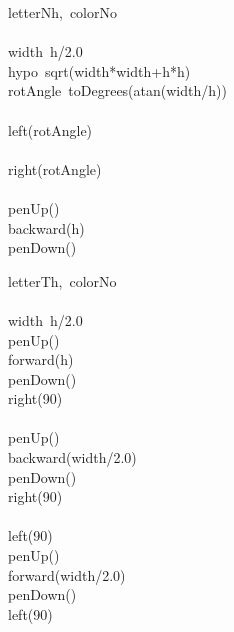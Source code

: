 \documentclass[a4paper,10pt]{article}
\begin{document}
\begin{pseudocode}{letterN}{h,\ colorNo }
\label{letterN}
\\
\\
  width\gets\ h/2.0\\
  hypo\gets\ sqrt(width*width+h*h)\\
  rotAngle\gets\ toDegrees(atan(width/h))\\
  \\
  left(rotAngle)\\
  \\
  right(rotAngle)\\
  \\
  penUp()\\
  backward(h)\\
  penDown()\\
\ENDPROCEDURE
\end{pseudocode}


\begin{pseudocode}{letterT}{h,\ colorNo }
\label{letterT}
\\
\\
  width\gets\ h/2.0\\
  penUp()\\
  forward(h)\\
  penDown()\\
  right(90)\\
  \\
  penUp()\\
  backward(width/2.0)\\
  penDown()\\
  right(90)\\
  \\
  left(90)\\
  penUp()\\
  forward(width/2.0)\\
  penDown()\\
  left(90)\\
\ENDPROCEDURE
\end{pseudocode}
\end{document}
